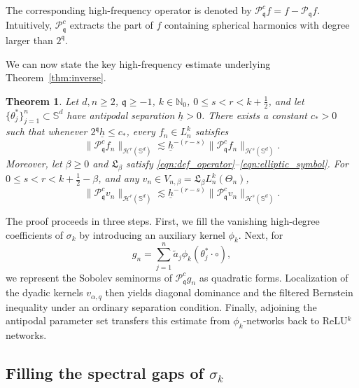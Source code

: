 \documentclass{article}
\numberwithin{equation}{section}
\newtheorem{theorem}{Theorem}
\def\NN{\mathbb{N}}
\def\SS{\mathbb{S}}
\def\sul{\sum\limits}
\def\pc{\mathcal{P}^c}
\def\mq{\mathfrak{q}}
\begin{document}
The corresponding high-frequency operator is denoted by 
$\mathcal{P}^c_{\mq}f=f-\mathcal{P}_{\mq}f$. 
Intuitively, $\mathcal{P}^c_{\mq}$ extracts the part of $f$ containing spherical harmonics with degree larger than $2^\mq$.

\medskip
We can now state the key high-frequency estimate underlying Theorem~\ref{thm:inverse}.

\begin{theorem}\label{thm_inverse_hig_freq}
    Let $d,n\geq2$, $\mq\geq-1$, $k\in\NN_0$, $0\leq s<r< k+\frac{1}{2}$, and let $\{\theta_j^*\}_{j=1}^n\subset\SS^d$ have antipodal separation $\underline h>0$. There exists a constant $c_*>0$ such that whenever $2^\mq\underline h\leq c_*$, every $f_n\in L_n^k$ satisfies
    \begin{equation}\label{eqn_inver_highfre}
        \|\pc_\mq f_n\|_{\mathcal{H}^r(\SS^d)}\lesssim 
        \underline{h}^{-(r-s)}\|\pc_\mq f_n\|_{\mathcal{H}^s(\SS^d)}.
    \end{equation}
    Moreover, let $\beta\geq0$ and $\mathfrak L_\beta$ satisfy \eqref{eqn:def_operator}--\eqref{eqn:elliptic_symbol}. For $0\leq s<r< k+\frac{1}{2}-\beta$, and any $v_n\in V_{n,\beta}=\mathfrak{L}_\beta L_n^k(\Theta_n)$,
\begin{equation}\label{eqn:filtered_residual_bernstein}
\|\mathcal P_{\mathfrak q}^c v_n\|_{\mathcal H^{r}(\SS^d)}\lesssim\underline h^{-(r-s)}\|\mathcal P_{\mathfrak q}^c v_n\|_{\mathcal H^{s}(\SS^d)}.
\end{equation}
\end{theorem}


The proof proceeds in three steps. First, we fill the vanishing high-degree coefficients of $\sigma_k$ by introducing an auxiliary kernel $\phi_k$. Next, for
$$
g_n=\sul_{j=1}^n\tilde a_j\phi_k(\theta_j^*\cdot\circ),
$$
we represent the Sobolev seminorms of $\pc_\mq g_n$ as quadratic forms. Localization of the dyadic kernels $v_{\alpha,q}$ then yields diagonal dominance and the filtered Bernstein inequality under an ordinary separation condition. Finally, adjoining the antipodal parameter set transfers this estimate from $\phi_k$-networks back to ReLU$^k$ networks.
\subsection{Filling the spectral gaps of $\sigma_k$}
\end{document}
